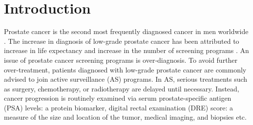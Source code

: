 
\section{Introduction}
\label{sec:introduction}
Prostate cancer is the second most frequently diagnosed cancer in men worldwide \cite{GlobalCancerStats2012}. The increase in diagnosis of low-grade prostate cancer has been attributed to increase in life expectancy and increase in the number of screening programs \cite{potoskyPSAcancer}. An issue of prostate cancer screening programs is over‐diagnosis. To avoid further over-treatment, patients diagnosed with low-grade prostate cancer are commonly advised to join active surveillance (AS) programs. In AS, serious treatments such as surgery, chemotherapy, or radiotherapy are delayed until necessary. Instead, cancer progression is routinely examined via serum prostate-specific antigen (PSA) levels: a protein biomarker, digital rectal examination (DRE) score: a measure of the size and location of the tumor, medical imaging, and biopsies etc.

